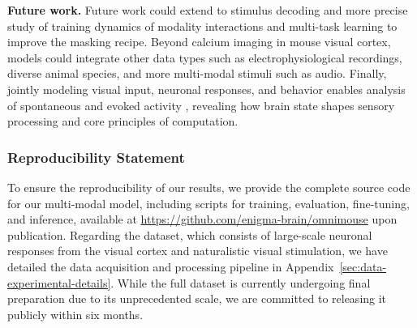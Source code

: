 \documentclass{article} %
\begin{document}
\textbf{Future work.} 
Future work could extend to stimulus decoding \citep{benchetrit2023brain, bauer2024movie, zhu2025multi} and more precise study of training dynamics of modality interactions and multi-task learning to improve the masking recipe. Beyond calcium imaging in mouse visual cortex, models could integrate other data types such as electrophysiological recordings, diverse animal species, and more multi-modal stimuli such as audio. %
Finally, jointly modeling visual input, neuronal responses, and behavior enables analysis of spontaneous and evoked activity \citep{stringer2019spontaneous}, revealing how brain state shapes sensory processing and core principles of computation.

\newpage
\subsubsection*{Reproducibility Statement}
To ensure the reproducibility of our results, we provide the complete source code for our multi-modal model, including scripts for training, evaluation, fine-tuning, and inference, available at \url{https://github.com/enigma-brain/omnimouse} upon publication. Regarding the dataset, which consists of large-scale neuronal responses from the visual cortex and naturalistic visual stimulation, we have detailed the data acquisition and processing pipeline in Appendix~\ref{sec:data-experimental-details}. While the full dataset is currently undergoing final preparation due to its unprecedented scale, we are committed to releasing it publicly within six months.
\end{document}

